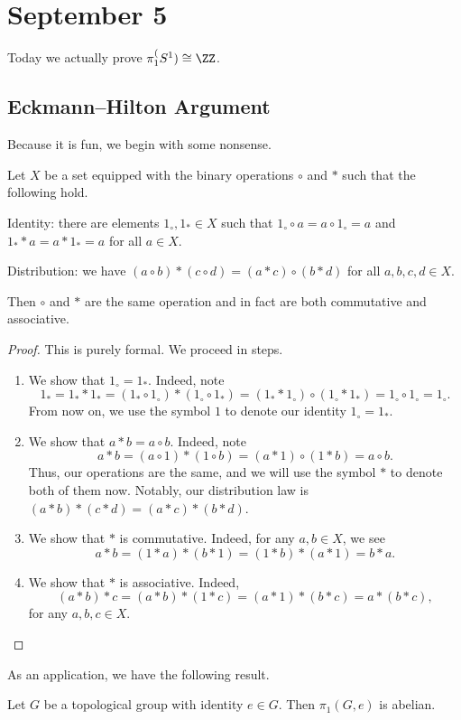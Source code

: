 \documentclass[../notes.tex]{subfiles}
\begin{document}
\section{September 5}

Today we actually prove $\pi_1^(S^1)\cong\ZZ$.

\subsection{Eckmann--Hilton Argument}
Because it is fun, we begin with some nonsense.
\begin{proposition} \label{prop:eh}
	Let $X$ be a set equipped with the binary operations $\circ$ and $*$ such that the following hold.
	\begin{listalph}
		\item Identity: there are elements $1_\circ,1_*\in X$ such that $1_\circ\circ a=a\circ1_\circ=a$ and $1_**a=a*1_*=a$ for all $a\in X$.
		\item Distribution: we have $(a\circ b)*(c\circ d)=(a*c)\circ(b*d)$ for all $a,b,c,d\in X$.
	\end{listalph}
	Then $\circ$ and $*$ are the same operation and in fact are both commutative and associative.
\end{proposition}
\begin{proof}
	This is purely formal. We proceed in steps.
	\begin{enumerate}
		\item We show that $1_\circ=1_*$. Indeed, note
		\[1_*=1_**1_*=(1_*\circ1_\circ)*(1_\circ\circ1_*)=(1_**1_\circ)\circ(1_\circ*1_*)=1_\circ\circ1_\circ=1_\circ.\]
		From now on, we use the symbol $1$ to denote our identity $1_\circ=1_*$.
		\item We show that $a*b=a\circ b$. Indeed, note
		\[a*b=(a\circ1)*(1\circ b)=(a*1)\circ(1*b)=a\circ b.\]
		Thus, our operations are the same, and we will use the symbol $*$ to denote both of them now. Notably, our distribution law is $(a*b)*(c*d)=(a*c)*(b*d)$.
		\item We show that $*$ is commutative. Indeed, for any $a,b\in X$, we see
		\[a*b=(1*a)*(b*1)=(1*b)*(a*1)=b*a.\]
		\item We show that $*$ is associative. Indeed,
		\[(a*b)*c=(a*b)*(1*c)=(a*1)*(b*c)=a*(b*c),\]
		for any $a,b,c\in X$.
		\qedhere
	\end{enumerate}
\end{proof}
As an application, we have the following result.
\begin{corollary}
	Let $G$ be a topological group with identity $e\in G$. Then $\pi_1(G,e)$ is abelian.
\end{corollary}
\end{document}
